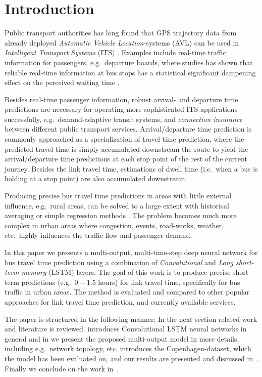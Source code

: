 \documentclass[preprint,11pt,5p,twocolumn]{elsarticle}
\begin{document}
\section{Introduction}
Public transport authorities has long found that GPS trajectory data from already deployed \emph{Automatic Vehicle Location}-systems (AVL) can be used in \emph{Intelligent Transport Systems} (ITS) \cite{Tcrp48}. Examples include real-time traffic information for passengers, e.g.\ departure boards, where studies has shown that reliable real-time information at bus stops has a statistical significant dampening effect on the perceived waiting time \cite{Fan2016}.

Besides real-time passenger information, robust arrival- and departure time predictions are necessary for operating more sophisticated ITS applications successfully, e.g.\ demand-adaptive transit systems, and \emph{connection insurance} between different public transport services. Arrival/departure time prediction is commonly approached as a specialization of travel time prediction, where the predicted travel time is simply accumulated downstream the route to yield the arrival/departure time predictions at each stop point of the rest of the current journey. Besides the link travel time, estimations of dwell time (i.e.\ when a bus is holding at a stop point) are also accumulated downstream.

Producing precise bus travel time predictions in areas with little external influence, e.g.\ rural areas, can be solved to a large extent with historical averaging or simple regression methods \cite{Williams2003,Altinkaya2013}. The problem becomes much more complex in urban areas where congestion, events, road-works, weather, etc.\ highly influences the traffic flow and passenger demand.

In this paper we presents a multi-output, multi-time-step deep neural network for bus travel time prediction using a combination of \emph{Convolutional} and \emph{Long short-term memory} (LSTM) \cite{Lstm1,Lstm2} layers. The goal of this work is to produce precise short-term predictions (e.g.\ $0-1.5$ hours) for link travel time, specifically for bus traffic in urban areas. The method is evaluated and compared to other popular approaches for link travel time prediction, and currently available services.

The paper is structured in the following manner: In the next section related work and literature is reviewed.  introduces Convolutional LSTM neural networks in general and in  we present the proposed multi-output model in more details, including e.g.\ network topology, etc.  introduces the Copenhagen-dataset, which the model has been evaluated on, and our results are presented and discussed in~. Finally we conclude on the work in~.
\end{document}
